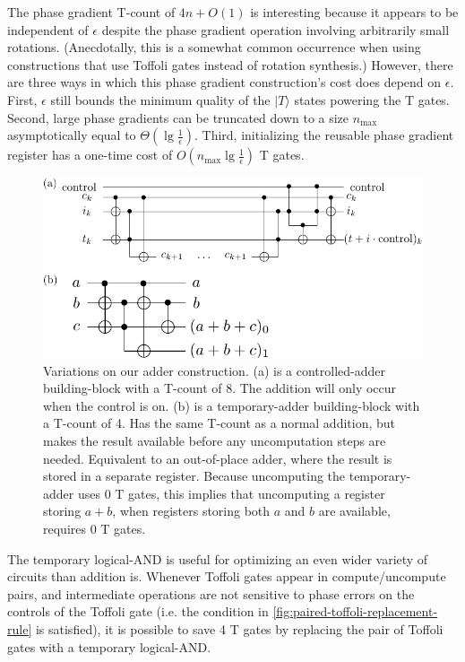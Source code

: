 \documentclass[twocolumn]{quantumarticle-customized}
\begin{document}
The phase gradient T-count of $4n + O(1)$ is interesting because it appears to be independent of $\epsilon$ despite the phase gradient operation involving arbitrarily small rotations.
(Anecdotally, this is a somewhat common occurrence when using constructions that use Toffoli gates instead of rotation synthesis.)
However, there are three ways in which this phase gradient construction's cost does depend on $\epsilon$.
First, $\epsilon$ still bounds the minimum quality of the $|T\rangle$ states powering the T gates.
Second, large phase gradients can be truncated down to a size $n_{\text{max}}$ asymptotically equal to $\Theta(\lg \frac{1}{\epsilon})$.
Third, initializing the reusable phase gradient register has a one-time cost of $O(n_{\text{max}} \lg \frac{1}{\epsilon})$ T gates.

\begin{figure}
  \includegraphics[width=\linewidth]{other-adder-building-blocks.pdf}
  \caption{
	Variations on our adder construction.
	(a) is a controlled-adder building-block with a T-count of 8.
	The addition will only occur when the control is on.
	(b) is a temporary-adder building-block with a T-count of 4.
	Has the same T-count as a normal addition, but makes the result available before any uncomputation steps are needed.
	Equivalent to an out-of-place adder, where the result is stored in a separate register.
	Because uncomputing the temporary-adder uses 0 T gates, this implies that uncomputing a register storing $a+b$, when registers storing both $a$ and $b$ are available, requires 0 T gates.
  }
  \label{fig:other-adder-building-blocks}
\end{figure}

The temporary logical-AND is useful for optimizing an even wider variety of circuits than addition is.
Whenever Toffoli gates appear in compute/uncompute pairs, and intermediate operations are not sensitive to phase errors on the controls of the Toffoli gate (i.e. the condition in \autoref{fig:paired-toffoli-replacement-rule} is satisfied), it is possible to save 4 T gates by replacing the pair of Toffoli gates with a temporary logical-AND.
\end{document}
